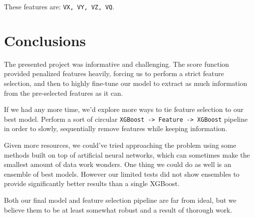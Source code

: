 \documentclass{article}
\begin{document}
These features are: \verb|VX, VY, VZ, VQ|.

\section{Conclusions}

The presented project was informative and challenging. The score function provided penalized features heavily, forcing us to perform a strict feature selection, and
then to highly fine-tune our model to extract as much information from the pre-selected features as it can.

If we had any more time, we'd explore more ways to tie feature selection to our best model. Perform a sort of circular \verb|XGBoost -> Feature -> XGBoost| pipeline in order to slowly, sequentially remove features while keeping information. 

Given more resources, we could've tried approaching the problem using some methods built on top of artificial neural networks, which can sometimes make the smallest amount of data work wonders.
One thing we could do as well is an ensemble of best models. However our limited tests
did not show ensembles to provide significantly better results than a single XGBoost. 

Both our final model and feature selection pipeline are far from ideal, but we believe them to be at least somewhat robust and a result of thorough work.
\end{document}

